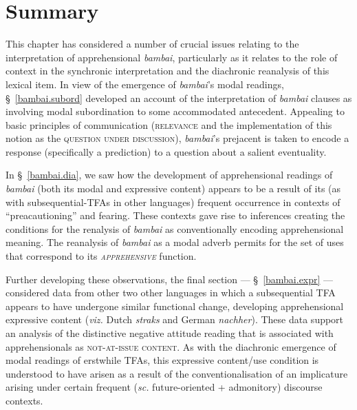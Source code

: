 \xe

\section{Summary}


This chapter has considered a number of crucial issues relating to the interpretation of apprehensional \textit{bambai}, particularly as it relates to the role of context in the synchronic interpretation and the diachronic reanalysis of this lexical item. In view of the emergence of \textit{bambai}'s modal readings, \S~\ref{bambai.subord} developed an account of the interpretation of \textit{bambai} clauses as involving modal subordination to some accommodated antecedent. Appealing to basic principles of communication (\textsc{relevance} and the implementation of this notion as the \textsc{question under discussion}), \textit{bambai}'s prejacent is taken to encode a response (specifically a prediction) to a question about a salient eventuality.


In §~\ref{bambai.dia}, we saw how the development of apprehensional readings of \textit{bambai} (both its modal and expressive content) appears to be a result of its (as with subseq\-uential-TFAs in other languages) frequent occurrence in contexts of ``preacautioning'' and fearing. These contexts gave rise to inferences creating the conditions for the renalysis of \textit{bambai} as conventionally encoding apprehensional meaning. The reanalysis of \textit{bambai} as a modal adverb permits for the set of uses that correspond to its \textit{\textsc{apprehensive}} function.

Further developing these observations, the final section --- \S~\ref{bambai.expr} --- considered data from other two other languages in which a subsequential TFA appears to have undergone similar functional change, developing apprehensional expressive content (\textit{viz.} Dutch \textit{straks} and German \textit{nachher}). These data support an analysis of the distinctive negative attitude reading that is associated with apprehensionals as \textsc{not-at-issue content}. As with the diachronic emergence of modal readings of erstwhile TFAs, this expressive content/use condition is understood to have arisen as a result of the conventionalisation of an implicature arising under certain frequent (\textit{sc. }future-oriented + admonitory) discourse contexts.


